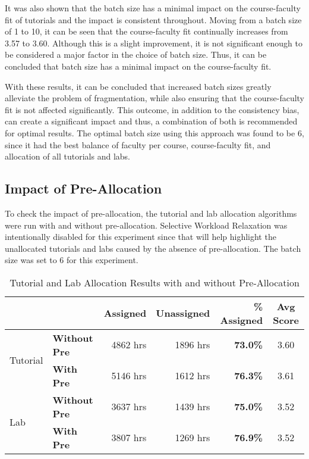 It was also shown that the batch size has a minimal impact on the course-faculty fit of tutorials and the impact is consistent throughout. Moving from a batch size of 1 to 10, it can be seen that the course-faculty fit continually increases from 3.57 to 3.60. Although this is a slight improvement, it is not significant enough to be considered a major factor in the choice of batch size. Thus, it can be concluded that batch size has a minimal impact on the course-faculty fit.

With these results, it can be concluded that increased batch sizes greatly alleviate the problem of fragmentation, while also ensuring that the course-faculty fit is not affected significantly. This outcome, in addition to the consistency bias, can create a significant impact and thus, a combination of both is recommended for optimal results. The optimal batch size using this approach was found to be 6, since it had the best balance of faculty per course, course-faculty fit, and allocation of all tutorials and labs.

\subsection{Impact of Pre-Allocation}

To check the impact of pre-allocation, the tutorial and lab allocation algorithms were run with and without pre-allocation. Selective Workload Relaxation was intentionally disabled for this experiment since that will help highlight the unallocated tutorials and labs caused by the absence of pre-allocation. The batch size was set to 6 for this experiment.

\begin{table}[H]
  \centering
  \begin{tabular}{|l|l|r|r|r|c|}
    \hline
                              &                      & \textbf{Assigned} & \textbf{Unassigned} & \textbf{\% Assigned} & \textbf{Avg Score} \\ \hline
    \multirow{2}{*}{Tutorial} & \textbf{Without Pre} & 4862 hrs          & 1896 hrs            & \textbf{73.0\%}      & 3.60               \\
                              & \textbf{With Pre}    & 5146 hrs          & 1612 hrs            & \textbf{76.3\%}      & 3.61               \\ \hline
    \multirow{2}{*}{Lab}      & \textbf{Without Pre} & 3637 hrs          & 1439 hrs            & \textbf{75.0\%}      & 3.52               \\
                              & \textbf{With Pre}    & 3807 hrs          & 1269 hrs            & \textbf{76.9\%}      & 3.52               \\ \hline
  \end{tabular}
  \caption{Tutorial and Lab Allocation Results with and without Pre-Allocation}
  \label{tab:pre_allocation}
\end{table}


